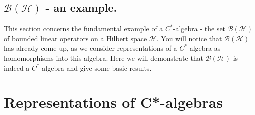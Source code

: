 \documentclass[12pt,a4paper]{amsart}
\theoremstyle{plain}
\theoremstyle{definition}
\renewcommand{\H}{\mathcal{H}}
\newcommand{\B}{\mathcal{B}}
\newcommand{\1}{\mathbbm{1}}
\begin{document}
\subsection{$\B(\H)$ - an example.}
This section concerns the fundamental example of a $C^\ast$-algebra - the set $\B(\H)$ of bounded 
linear operators on a Hilbert space $\H$. You will notice that $\B(\H)$ has already come up, 
as we consider representations of a $C^\ast$-algebra as homomorphisms into this algebra. 
Here we will demonstrate that $\B(\H)$ is indeed a $C^\ast$-algebra and give some basic results.

\section{Representations of C*-algebras}
\end{document}
